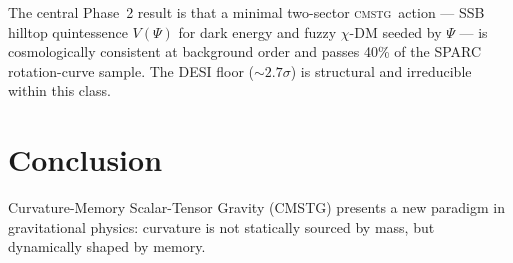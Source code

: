 \documentclass[12pt,a4paper]{article}
\newcommand{\CMSTG}{\textsc{cmstg}}
\begin{document}
The central Phase~2 result is that a minimal two-sector \CMSTG\ action ---
SSB hilltop quintessence $V(\Psi)$ for dark energy and fuzzy $\chi$-DM seeded
by $\Psi$ --- is cosmologically consistent at background order and passes 40\%
of the SPARC rotation-curve sample.  The DESI floor ($\sim2.7\sigma$) is
structural and irreducible within this class.

\section{Conclusion}
\label{sec:conclusion}

Curvature-Memory Scalar-Tensor Gravity (CMSTG) presents a new paradigm in gravitational
physics: curvature is not statically sourced by mass, but dynamically shaped by memory.
\end{document}
